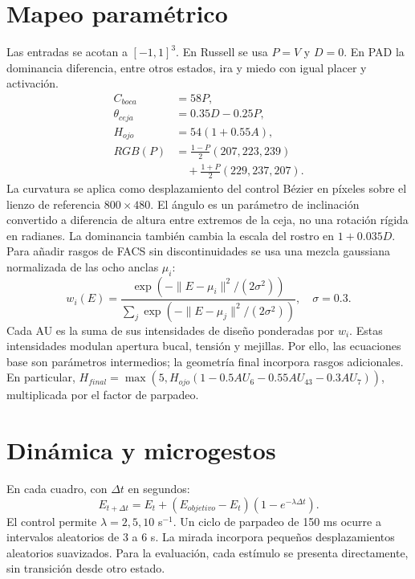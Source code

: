 \documentclass[conference]{IEEEtran}
\begin{document}
\section{Mapeo paramétrico}
Las entradas se acotan a $[-1,1]^3$. En Russell se usa $P=V$ y $D=0$. En PAD la dominancia diferencia, entre otros estados, ira y miedo con igual placer y activación.
\begin{align}
C_{boca} &= 58P,\\
\theta_{ceja} &= 0.35D - 0.25P,\\
H_{ojo} &= 54(1+0.55A),\\
RGB(P) &= \frac{1-P}{2}(207,223,239) \\
&\quad+\frac{1+P}{2}(229,237,207).
\end{align}
La curvatura se aplica como desplazamiento del control Bézier en píxeles sobre el lienzo de referencia $800\times480$. El ángulo es un parámetro de inclinación convertido a diferencia de altura entre extremos de la ceja, no una rotación rígida en radianes. La dominancia también cambia la escala del rostro en $1+0.035D$.
Para añadir rasgos de FACS sin discontinuidades se usa una mezcla gaussiana normalizada de las ocho anclas $\mu_i$:
\begin{equation}
w_i(E)=\frac{\exp(-\|E-\mu_i\|^2/(2\sigma^2))}{\sum_j\exp(-\|E-\mu_j\|^2/(2\sigma^2))},\quad \sigma=0.3.
\end{equation}
Cada AU es la suma de sus intensidades de diseño ponderadas por $w_i$. Estas intensidades modulan apertura bucal, tensión y mejillas. Por ello, las ecuaciones base son parámetros intermedios; la geometría final incorpora rasgos adicionales. En particular, $H_{final}=\max(5,H_{ojo}(1-0.5AU_6-0.55AU_{43}-0.3AU_7))$, multiplicada por el factor de parpadeo.
\section{Dinámica y microgestos}
En cada cuadro, con $\Delta t$ en segundos:
\begin{equation}
E_{t+\Delta t}=E_t+(E_{objetivo}-E_t)(1-e^{-\lambda\Delta t}).
\end{equation}
El control permite $\lambda=2,5,10$ s$^{-1}$. Un ciclo de parpadeo de 150 ms ocurre a intervalos aleatorios de 3 a 6 s. La mirada incorpora pequeños desplazamientos aleatorios suavizados. Para la evaluación, cada estímulo se presenta directamente, sin transición desde otro estado.
\end{document}
